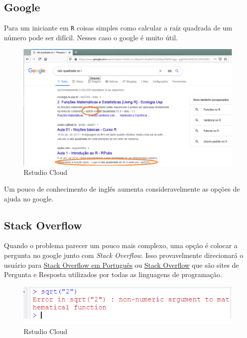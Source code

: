 \documentclass[
]{book}
\theoremstyle{definition}
\theoremstyle{definition}
\theoremstyle{definition}
\theoremstyle{remark}
\begin{document}
\hypertarget{google}{%
\subsection{Google}\label{google}}

Para um iniciante em \texttt{R} coisas simples como calcular a raíz quadrada de um número pode ser difícil. Nesses caso o google é muito útil.

\begin{figure}
\includegraphics[width=0.9\linewidth]{Figuras/sqrt} \caption{Rstudio Cloud}\label{fig:sq1}
\end{figure}

Um pouco de conhecimento de inglês aumenta consideravelmente as opções de ajuda no google.

\hypertarget{stack-overflow}{%
\subsection{Stack Overflow}\label{stack-overflow}}

Quando o problema parecer um pouco mais complexo, uma opção é colocar a pergunta no google junto com \emph{Stack Overflow}. Isso provavelmente direcionará o usuário para \href{https://pt.stackoverflow.com/}{Stack Overflow em Português} ou \href{https://stackoverflow.com/}{Stack Overflow} que são sites de Pergunta e Resposta utilizados por todas as linguagens de programação.

\begin{figure}
\includegraphics[width=0.9\linewidth]{Figuras/sqrt3} \caption{Rstudio Cloud}\label{fig:sq3}
\end{figure}
\end{document}
